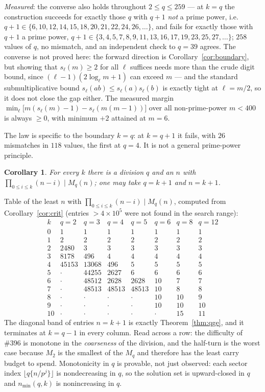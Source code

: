 \documentclass[11pt]{article}
\newtheorem{corollary}[theorem]{Corollary}
\begin{document}
\emph{Measured}: the converse also holds throughout $2\le q\le259$ --- at $k=q$ the
construction succeeds for exactly those $q$ with $q+1$ \emph{not} a prime power, i.e.\
$q+1\in\{6,10,12,14,15,18,20,21,22,24,26,\dots\}$, and fails for exactly those with $q+1$ a
prime power, $q+1\in\{3,4,5,7,8,9,11,13,16,17,19,23,25,27,\dots\}$; $258$ values of $q$, no
mismatch, and an independent check to $q=39$ agrees.  The converse is not proved here: the
forward direction is Corollary~\ref{cor:boundary}, but showing that $s_\ell(m)\ge2$ for all
$\ell$ suffices needs more than the crude digit bound, since $(\ell-1)(2\log_\ell m+1)$ can
exceed $m$ --- and the standard submultiplicative bound $s_\ell(ab)\le s_\ell(a)s_\ell(b)$ is
exactly tight at $\ell=m/2$, so it does not close the gap either.  The measured margin
$\min_\ell\bigl[m(s_\ell(m)-1)-s_\ell(m(m-1))\bigr]$ over all non-prime-power $m<400$ is
always $\ge0$, with minimum $+2$ attained at $m=6$.

The law is specific to the boundary $k=q$: at $k=q+1$ it fails, with $26$ mismatches in $118$
values, the first at $q=4$.  It is not a general prime-power principle.

\begin{corollary}
For every $k$ there is a division $q$ and an $n$ with $\prod_{0\le i\le k}(n-i)\mid M_q(n)$;
one may take $q=k+1$ and $n=k+1$.
\end{corollary}

Table of the least $n$ with $\prod_{0\le i\le k}(n-i)\mid M_q(n)$, computed from
Corollary~\ref{cor:crit} (entries $>4\times10^{5}$ were not found in the search range):
\[
\begin{array}{r|rrrrrrr}
 k & q{=}2 & q{=}3 & q{=}4 & q{=}5 & q{=}6 & q{=}8 & q{=}12\\\hline
 0 & 1 & 1 & 1 & 1 & 1 & 1 & 1\\
 1 & 2 & 2 & 2 & 2 & 2 & 2 & 2\\
 2 & 2480 & 3 & 3 & 3 & 3 & 3 & 3\\
 3 & 8178 & 496 & 4 & 4 & 4 & 4 & 4\\
 4 & 45153 & 13068 & 496 & 5 & 5 & 5 & 5\\
 5 & \cdot & 44255 & 2627 & 6 & 6 & 6 & 6\\
 6 & \cdot & 48512 & 2628 & 2628 & 10 & 7 & 7\\
 7 & \cdot & 48513 & 48513 & 48513 & 10 & 8 & 8\\
 8 & \cdot & \cdot & \cdot & \cdot & 10 & 10 & 9\\
 9 & \cdot & \cdot & \cdot & \cdot & 10 & 10 & 10\\
10 & \cdot & \cdot & \cdot & \cdot & \cdot & 15 & 11
\end{array}
\]
The diagonal band of entries $n=k+1$ is exactly Theorem~\ref{thm:qge}, and it terminates at
$k=q-1$ in every column.  Read across a row: the difficulty of \#396 is monotone in the
\emph{coarseness} of the division, and the half-turn is the worst case because $M_2$ is the
smallest of the $M_q$ and therefore has the least carry budget to spend.  Monotonicity in $q$
is provable, not just observed: each sector index $\lfloor q\{n/p^{j}\}\rfloor$ is
nondecreasing in $q$, so the solution set is upward-closed in $q$ and $n_{\min}(q,k)$ is
nonincreasing in $q$.
\end{document}
